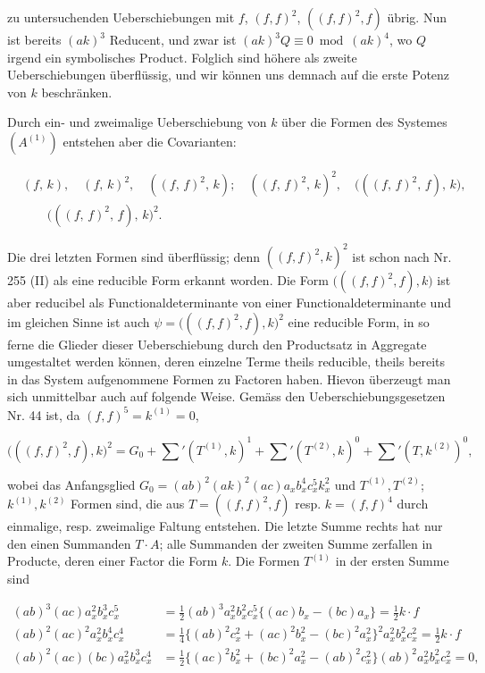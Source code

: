 zu untersuchenden Ueberschiebungen mit $f$, $(f, f)^2$, $((f, f)^2, f)$ übrig.
Nun ist bereits $(ak)^3$ Reducent, und zwar ist $(ak)^3 Q \equiv 0 \bmod (ak)^4$,
wo $Q$ irgend ein symbolisches Product. Folglich sind höhere als
zweite Ueberschiebungen überflüssig, und wir können uns demnach
auf die erste Potenz von $k$ beschränken.

Durch ein- und zweimalige Ueberschiebung von $k$ über die
Formen des Systemes $(A^{(1)})$ entstehen aber die Covarianten:

\[
\begin{aligned}
&(f,\, k), \quad (f,\, k)^2, \quad ((f,\, f)^2,\, k); \quad ((f,\, f)^2,\, k)^2, \quad \bigl(((f,\, f)^2,\, f),\, k\bigr),\\
&\qquad \bigl(((f,\, f)^2,\, f),\, k\bigr)^2.
\end{aligned}
\]

Die drei letzten Formen sind überflüssig; denn $((f, f)^2, k)^2$ ist schon
nach Nr. 255 (II) als eine reducible Form erkannt worden. Die Form
$\bigl(((f, f)^2, f), k\bigr)$ ist aber reducibel als Functionaldeterminante von einer
Functionaldeterminante und im gleichen Sinne ist auch $\psi = \bigl(((f,f)^2, f), k\bigr)^2$
eine reducible Form, in so ferne die Glieder dieser Ueberschiebung
durch den Productsatz in Aggregate umgestaltet werden können, deren
einzelne Terme theils reducible, theils bereits in das System aufgenommene
 Formen zu Factoren haben. Hievon überzeugt man sich
unmittelbar auch auf folgende Weise. Gemäss den Ueberschiebungsgesetzen
 Nr. 44 ist, da $(f, f)^5 = k^{(1)} = 0$,

\[
\bigl(((f, f)^2, f), k\bigr)^2 = G_0 + \sum{}'(T^{(1)}, k)^1 + \sum{}'(T^{(2)}, k)^0 + \sum{}'(T, k^{(2)})^0,
\]

wobei das Anfangsglied $G_0 = (ab)^2 (ak)^2 (ac) a_x b_x^4 c_x^5 k_x^2$ und $T^{(1)}, T^{(2)}$;
$k^{(1)}, k^{(2)}$ Formen sind, die aus $T = ((f, f)^2, f)$ resp. $k = (f, f)^4$ durch
einmalige, resp. zweimalige Faltung entstehen. Die letzte Summe
rechts hat nur den einen Summanden $T \cdot A$; alle Summanden der
zweiten Summe zerfallen in Producte, deren einer Factor die Form $k$.
Die Formen $T^{(1)}$ in der ersten Summe sind

\[
\begin{aligned}
(ab)^3 (ac) a_x^2 b_x^3 c_x^5 &= \tfrac{1}{2} (ab)^3 a_x^2 b_x^2 c_x^5 \{(ac) b_x - (bc) a_x\} = \tfrac{1}{2} k \cdot f\\[4pt]
(ab)^2 (ac)^2 a_x^2 b_x^4 c_x^4 &= \tfrac{1}{4} \{(ab)^2 c_x^2 + (ac)^2 b_x^2 - (bc)^2 a_x^2\}^2 a_x^2 b_x^2 c_x^2 = \tfrac{1}{2} k \cdot f\\[4pt]
(ab)^2 (ac) (bc) a_x^2 b_x^3 c_x^4 &= \tfrac{1}{2} \{(ac)^2 b_x^2 + (bc)^2 a_x^2 - (ab)^2 c_x^2\} (ab)^2 a_x^2 b_x^2 c_x^2 = 0,
\end{aligned}
\]

